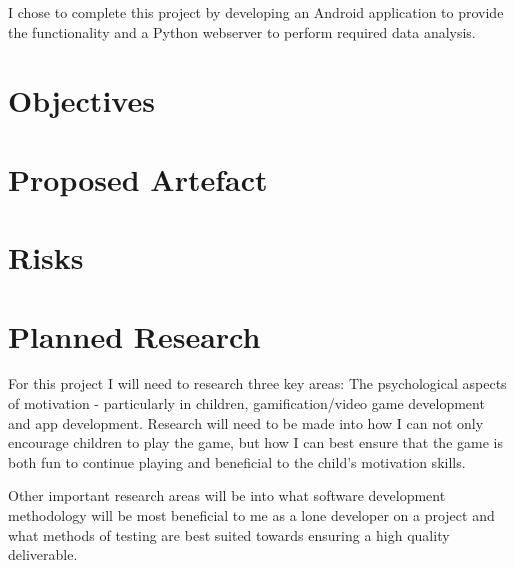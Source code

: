 I chose to complete this project by developing an Android application to provide the functionality and a Python webserver to perform required data analysis.

\section{Objectives}

\section{Proposed Artefact}

\section{Risks}

\section{Planned Research}
For this project I will need to research three key areas: The psychological aspects of motivation - particularly in children, gamification/video game development and app development.
Research will need to be made into how I can not only encourage children to play the game, but how I can best ensure that the game is both fun to continue playing and beneficial to the child's motivation skills.

Other important research areas will be into what software development methodology will be most beneficial to me as a lone developer on a project and what methods of testing are best suited towards ensuring a high quality deliverable.